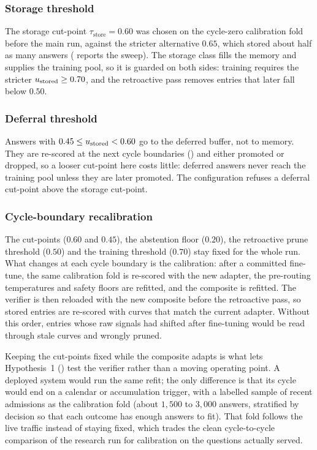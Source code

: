 \subsubsection{Storage threshold}
\label{sec:conformal-store}

The storage cut-point $\tau_{\text{store}} = 0.60$ was chosen on the cycle-zero calibration fold before the main run, against the stricter alternative $0.65$, which stored about half as many answers ( reports the sweep). The storage class fills the memory and supplies the training pool, so it is guarded on both sides: training requires the stricter $u_{\text{stored}} \ge 0.70$, and the retroactive pass removes entries that later fall below $0.50$.

\subsubsection{Deferral threshold}
\label{sec:conformal-defer}

Answers with $0.45 \le u_{\text{stored}} < 0.60$ go to the deferred buffer, not to memory. They are re-scored at the next cycle boundaries () and either promoted or dropped, so a looser cut-point here costs little: deferred answers never reach the training pool unless they are later promoted. The configuration refuses a deferral cut-point above the storage cut-point.

\subsubsection{Cycle-boundary recalibration}
\label{sec:conformal-cycle-recalib}

The cut-points ($0.60$ and $0.45$), the abstention floor ($0.20$), the retroactive prune threshold ($0.50$) and the training threshold ($0.70$) stay fixed for the whole run. What changes at each cycle boundary is the calibration: after a committed fine-tune, the same calibration fold is re-scored with the new adapter, the pre-routing temperatures and safety floors are refitted, and the composite is refitted. The verifier is then reloaded with the new composite before the retroactive pass, so stored entries are re-scored with curves that match the current adapter. Without this order, entries whose raw signals had shifted after fine-tuning would be read through stale curves and wrongly pruned.

Keeping the cut-points fixed while the composite adapts is what lets Hypothesis~1 () test the verifier rather than a moving operating point. A deployed system would run the same refit; the only difference is that its cycle would end on a calendar or accumulation trigger, with a labelled sample of recent admissions as the calibration fold (about $1{,}500$ to $3{,}000$ answers, stratified by decision so that each outcome has enough answers to fit). That fold follows the live traffic instead of staying fixed, which trades the clean cycle-to-cycle comparison of the research run for calibration on the questions actually served.

